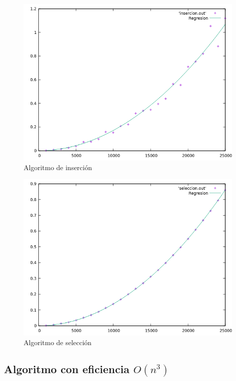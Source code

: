 \documentclass[12pt,spanish]{article}
\begin{document}
\begin{figure}[H]
\centering
\includegraphics[scale=0.75]{hibrida_insercion.png}
\caption{Algoritmo de inserción}
\end{figure}

\begin{figure}[H]
\centering
\includegraphics[scale=0.75]{hibrida_seleccion.png}
\caption{Algoritmo de selección}
\end{figure}

\subsection{Algoritmo con eficiencia $O(n^3)$}
\end{document}
